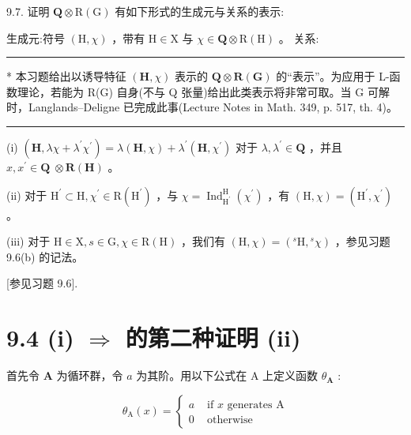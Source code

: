 \documentclass[10pt]{article}
\newcommand{\HRule}{\begin{center}\rule{0.9\linewidth}{0.2mm}\end{center}}
\begin{document}
9.7. 证明 \(\mathbf{Q} \otimes  \mathrm{R}\left( \mathrm{G}\right)\) 有如下形式的生成元与关系的表示:

生成元:符号 \(\left( {\mathrm{H},\chi }\right)\) ，带有 \(\mathrm{H} \in  \mathrm{X}\) 与 \(\chi  \in  \mathbf{Q} \otimes  \mathrm{R}\left( \mathrm{H}\right)\) 。 关系:

\HRule

* 本习题给出以诱导特征 \(\left( {\mathbf{H},\chi }\right)\) 表示的 \(\mathbf{Q} \otimes  \mathbf{R}\left( \mathbf{G}\right)\) 的“表示”。为应用于 L-函数理论，若能为 R(G) 自身(不与 Q 张量)给出此类表示将非常可取。当 G 可解时，Langlands–Deligne 已完成此事(Lecture Notes in Math. 349, p. 517, th. 4)。

\HRule

(i) \(\left( {\mathbf{H},{\lambda \chi } + {\lambda }^{\prime }{\chi }^{\prime }}\right)  = \lambda \left( {\mathbf{H},\chi }\right)  + {\lambda }^{\prime }\left( {\mathbf{H},{\chi }^{\prime }}\right)\) 对于 \(\lambda ,{\lambda }^{\prime } \in  \mathbf{Q}\) ，并且 \(x,{x}^{\prime } \in  \mathbf{Q} \; \otimes  \mathbf{R}\left( \mathbf{H}\right)\) 。

(ii) 对于 \({\mathrm{H}}^{\prime } \subset  \mathrm{H},{\chi }^{\prime } \in  \mathrm{R}\left( {\mathrm{H}}^{\prime }\right)\) ，与 \(\chi  = {\operatorname{Ind}}_{{\mathrm{H}}^{\prime }}^{\mathrm{H}}\left( {\chi }^{\prime }\right)\) ，有 \(\left( {\mathrm{H},\chi }\right)  = \left( {{\mathrm{H}}^{\prime },{\chi }^{\prime }}\right)\) 。

(iii) 对于 \(\mathrm{H} \in  \mathrm{X},s \in  \mathrm{G},\chi  \in  \mathrm{R}\left( \mathrm{H}\right)\) ，我们有 \(\left( {\mathrm{H},\chi }\right)  = \left( {{}^{s}\mathrm{H},{}^{s}\chi }\right)\) ，参见习题 9.6(b) 的记法。

[参见习题 9.6].

\section*{9.4 (i) \(\Rightarrow\) 的第二种证明 (ii)}

首先令 \(\mathbf{A}\) 为循环群，令 \(a\) 为其阶。用以下公式在 A 上定义函数 \({\theta }_{\mathbf{A}}\) :

\[
{\theta }_{\mathrm{A}}\left( x\right)  = \left\{  \begin{array}{ll} a & \text{ if }x\text{ generates }\mathrm{A} \\  0 & \text{ otherwise } \end{array}\right.
\]
\end{document}
